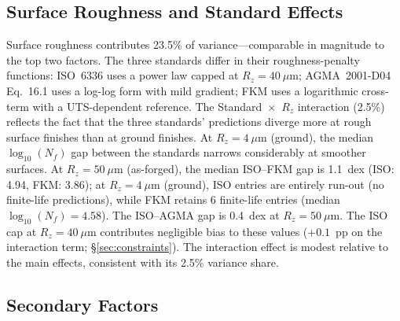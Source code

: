 \documentclass[12pt,a4paper]{article}
\begin{document}
\subsection{Surface Roughness and Standard Effects}

Surface roughness contributes 23.5\% of variance---comparable in magnitude
to the top two factors. The three standards differ in their
roughness-penalty functions: ISO~6336 uses a power law capped at
$R_z=40~\mu$m; AGMA~2001-D04 Eq.~16.1 uses a log-log form with mild
gradient; FKM uses a logarithmic cross-term with a UTS-dependent
reference. The Standard~$\times$~$R_z$ interaction (2.5\%) reflects the
fact that the three standards' predictions diverge more at rough surface
finishes than at ground finishes. At $R_z=4~\mu$m (ground), the median
$\log_{10}(N_f)$ gap between the standards narrows considerably at
smoother surfaces. At $R_z=50~\mu$m (as-forged), the median
ISO--FKM gap is 1.1~dex (ISO: 4.94, FKM: 3.86); at
$R_z=4~\mu$m (ground), ISO entries are entirely run-out (no
finite-life predictions), while FKM retains 6 finite-life entries
(median $\log_{10}(N_f)=4.58$). The ISO--AGMA gap is 0.4~dex at
$R_z=50~\mu$m. The ISO cap at $R_z=40~\mu$m contributes
negligible bias to these values ($+0.1$~pp on the interaction
term; \S\ref{sec:constraints}). The interaction effect is modest
relative to the main effects, consistent with its 2.5\% variance
share.

\subsection{Secondary Factors}
\end{document}
